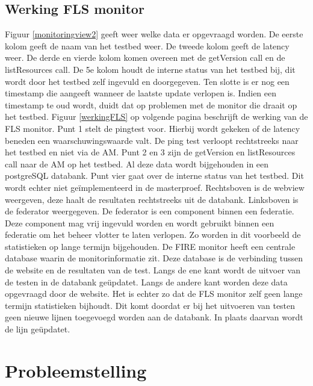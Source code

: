 \subsection{Werking FLS monitor}
\npar
Figuur \ref{monitoringview2} geeft weer welke data er opgevraagd worden. 
De eerste kolom geeft de naam van het testbed weer. De tweede kolom geeft de latency weer. De derde en vierde kolom komen overeen met de getVersion call en de listResources call. De 5e kolom houdt de interne status van het testbed bij, dit wordt door het testbed zelf ingevuld en doorgegeven. Ten slotte is er nog een timestamp die aangeeft wanneer de laatste update verlopen is. Indien een timestamp te oud wordt, duidt dat op problemen met de monitor die draait op het testbed.
\npar
Figuur \ref{werkingFLS} op volgende pagina beschrijft de werking van de FLS monitor. Punt 1 stelt de pingtest voor. Hierbij wordt gekeken of de latency beneden een waarschuwingswaarde valt. De ping test verloopt rechtstreeks naar het testbed en niet via de AM. Punt 2 en 3 zijn de getVersion en listResources call naar de AM op het testbed. Al deze data wordt bijgehouden in een postgreSQL databank. Punt vier gaat over de interne status van het testbed. Dit wordt echter niet geïmplementeerd in de masterproef.
\npar
Rechtsboven is de webview weergeven, deze haalt de resultaten rechtstreeks uit de databank. Linksboven is de federator weergegeven. De federator is een component binnen een federatie. Deze component mag vrij ingevuld worden en wordt gebruikt binnen een federatie om het beheer vlotter te laten verlopen. Zo worden in dit voorbeeld de statistieken op lange termijn bijgehouden.
\npar
De FIRE monitor heeft een centrale database waarin de monitorinformatie zit. Deze database is de verbinding tussen de website en de resultaten van de test. Langs de ene kant wordt de uitvoer van de testen in de databank geüpdatet. Langs de andere kant worden deze data opgevraagd door de website. Het is echter zo dat de FLS monitor zelf geen lange termijn statistieken bijhoudt. Dit komt doordat er bij het uitvoeren van testen geen nieuwe lijnen toegevoegd worden aan de databank. In plaats daarvan wordt de lijn geüpdatet.
\clearpage
\section{Probleemstelling}
